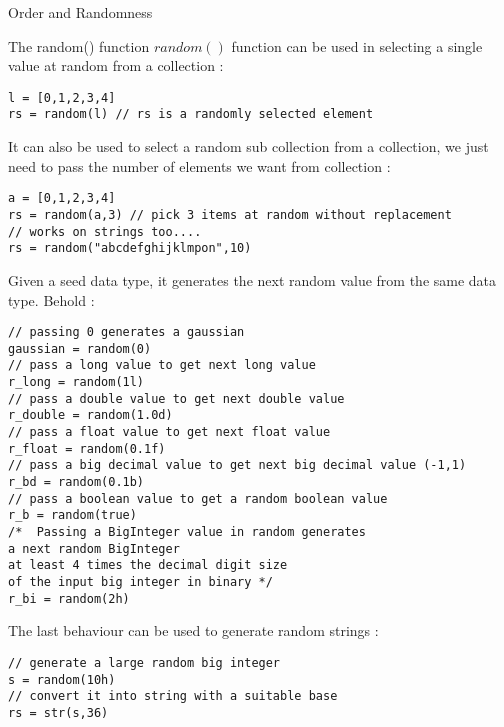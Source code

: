 \begin{section}{Order and Randomness}
\begin{subsection}{The random() function}
$random()$ function can be used in selecting a single value at random from a collection :
\begin{lstlisting}[style=JexlStyle]
l = [0,1,2,3,4]
rs = random(l) // rs is a randomly selected element 
\end{lstlisting}  

It can also be used to select a random sub collection from a collection,
we just need to pass the number of elements we want from collection :

\begin{lstlisting}[style=JexlStyle]
a = [0,1,2,3,4]
rs = random(a,3) // pick 3 items at random without replacement 
// works on strings too....
rs = random("abcdefghijklmpon",10) 
\end{lstlisting}  

Given a seed data type, it generates the next random value from 
the same data type. Behold : 

\begin{lstlisting}[style=JexlStyle]
// passing 0 generates a gaussian 
gaussian = random(0)
// pass a long value to get next long value 
r_long = random(1l)
// pass a double value to get next double value 
r_double = random(1.0d)
// pass a float value to get next float value 
r_float = random(0.1f)
// pass a big decimal value to get next big decimal value (-1,1) 
r_bd = random(0.1b)
// pass a boolean value to get a random boolean value 
r_b = random(true)
/*  Passing a BigInteger value in random generates 
a next random BigInteger
at least 4 times the decimal digit size 
of the input big integer in binary */
r_bi = random(2h)
\end{lstlisting}  

The last behaviour can be used to generate random strings :

\begin{lstlisting}[style=JexlStyle]
// generate a large random big integer 
s = random(10h)
// convert it into string with a suitable base 
rs = str(s,36)
\end{lstlisting}


\end{subsection}

\end{section}

